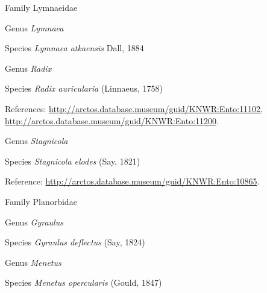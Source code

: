 \documentclass[9pt, article]{memoir}
\begin{document}
\begin{multicols}{2}
\vspace{6pt}\noindent\hspace{24pt}Family Lymnaeidae


\vspace{6pt}\noindent\hspace{30pt}Genus \textit{Lymnaea}


\vspace{6pt}\noindent\hspace{36pt}Species \textit{Lymnaea atkaensis} Dall, 1884


\vspace{6pt}\noindent\hspace{30pt}Genus \textit{Radix}


\vspace{6pt}\noindent\hspace{36pt}Species \textit{Radix auricularia} (Linnaeus, 1758)


\vspace{6pt}References: 
\url{http://arctos.database.museum/guid/KNWR:Ento:11102}, 
\url{http://arctos.database.museum/guid/KNWR:Ento:11200}.

\vspace{6pt}\noindent\hspace{30pt}Genus \textit{Stagnicola}


\vspace{6pt}\noindent\hspace{36pt}Species \textit{Stagnicola elodes} (Say, 1821)


\vspace{6pt}Reference: 
\url{http://arctos.database.museum/guid/KNWR:Ento:10865}.

\vspace{6pt}\noindent\hspace{24pt}Family Planorbidae


\vspace{6pt}\noindent\hspace{30pt}Genus \textit{Gyraulus}


\vspace{6pt}\noindent\hspace{36pt}Species \textit{Gyraulus deflectus} (Say, 1824)


\vspace{6pt}\noindent\hspace{30pt}Genus \textit{Menetus}


\vspace{6pt}\noindent\hspace{36pt}Species \textit{Menetus opercularis} (Gould, 1847)



\end{multicols}
\end{document}
